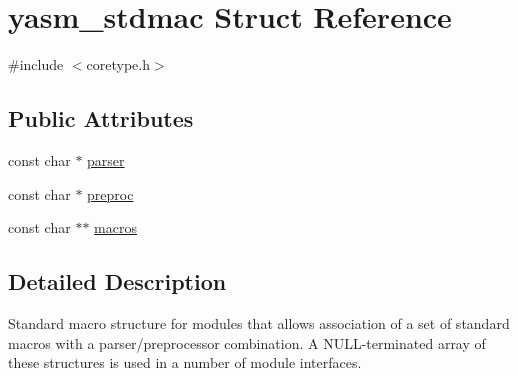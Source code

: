 \hypertarget{structyasm__stdmac}{\section{yasm\-\_\-stdmac Struct Reference}
\label{structyasm__stdmac}
}


{\ttfamily \#include $<$coretype.\-h$>$}

\subsection*{Public Attributes}
\begin{DoxyCompactItemize}
\item 
const char $\ast$ \hyperlink{structyasm__stdmac_a6dd3c2173fd8ad324fc6129ecd6f669b}{parser}
\item 
const char $\ast$ \hyperlink{structyasm__stdmac_ad35c0b9738195cac75e8907e8475dd52}{preproc}
\item 
const char $\ast$$\ast$ \hyperlink{structyasm__stdmac_a911720e695bfaf87dac4d286553eca25}{macros}
\end{DoxyCompactItemize}


\subsection{Detailed Description}
Standard macro structure for modules that allows association of a set of standard macros with a parser/preprocessor combination. A N\-U\-L\-L-\/terminated array of these structures is used in a number of module interfaces. 

